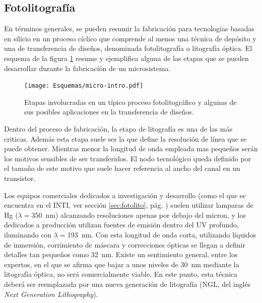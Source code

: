 	\subsection{Fotolitografía}

		En términos generales, se pueden resumir la fabricación para tecnologías basadas en silicio en un proceso cíclico que comprende al menos una técnica de depósito y una de transferencia de diseños, denominada fotolitografía o litografía óptica. El esquema de la figura \ref{fig:micro-intro} resume y ejemplifica alguna de las etapas que se pueden desarrollar durante la fabricación de un microsistema.
		
 			\begin{figure}[b!]
 				\begin{center}
 				\texttt{[image: Esquemas/micro-intro.pdf]}
 				\caption[Etapas de los procesos de microfabricación]{Etapas involucradas en un típico proceso fotolitográfico y algunas de sus posibles aplicaciones en la transferencia de diseños.}
 		   		\label{fig:micro-intro}
 		    	\end{center}
 		    	\end{figure}

	
		Dentro del proceso de fabricación, la etapa de litografía es una de las más criticas. Además esta etapa suele ser la que define la resolución de línea que se puede obtener. Mientras menor la longitud de onda empleada mas pequeños serán los motivos sensibles de ser transferidos. El nodo tecnológico queda definido por el tamaño de este motivo que suele hacer referencia al ancho del canal en un transistor.

		Los equipos comerciales dedicados a investigación y desarrollo (como el que se encuentra en el INTI, ver sección \ref{sec:fotolito}, pág. \pageref{sec:fotolito}) suelen utilizar lamparas de Hg ($\lambda=$\SI{350}{\nm}) alcanzando resoluciones apenas por debajo del micron, y los dedicados a producción utilizan fuentes de emisión dentro del UV profundo, iluminando con $\lambda=$\SI{193}{\nm}. Con esta longitud de onda corta, utilizando líquidos de inmersión, corrimiento de máscara y correcciones ópticas se llegan a definir detalles tan pequeños como \SI{32}{\nm}.\cite{moore2006a} Existe un sentimiento general, entre los expertos, en el que se afirma que bajar a unos niveles de \SI{30}{\nm} mediante la litografía óptica, no será comercialmente viable. En este punto, esta técnica deberá ser reemplazada por una nueva generación de litografía (NGL, del inglés \textit{Next Generation Lithography}).\cite{Asano2017,Schoot2017,Hasan2017,Naujok2017,Wan2017}
	
